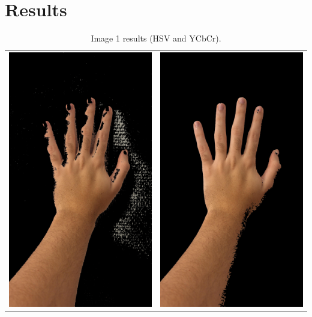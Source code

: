 \documentclass[journal]{IEEEtran}
\begin{document}
\section{Results}

\begin{table}[!htbp]
\centering
\begin{tabular}{cc}
    \includegraphics[width=0.3\linewidth]{../images/results/hand1_skin_hsv.jpg} & \includegraphics[width=0.3\linewidth]{../images/results/hand1_skin_ycc.jpg} \\
\end{tabular}
\caption{Image 1 results (HSV and YCbCr).}
\label{tab:imagens}
\end{table}
\end{document}
